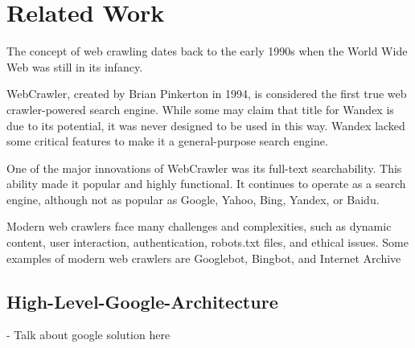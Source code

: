 \chapter{Related Work}
\label{chap:relatedwork}
The concept of web crawling dates back to the early 1990s when the World Wide Web was still in its infancy.

WebCrawler, created by Brian Pinkerton in 1994, is considered the first true web crawler-powered search engine. While some may claim that title for Wandex is due to its potential, it was never designed to be used in this way. Wandex lacked some critical features to make it a general-purpose search engine.

One of the major innovations of WebCrawler was its full-text searchability. This ability made it popular and highly functional. It continues to operate as a search engine, although not as popular as Google, Yahoo, Bing, Yandex, or Baidu.

Modern web crawlers face many challenges and complexities, such as dynamic content, user interaction, authentication, robots.txt files, and ethical issues. Some examples of modern web crawlers are Googlebot, Bingbot, and Internet Archive

\section{High-Level-Google-Architecture}

- Talk about google solution here

